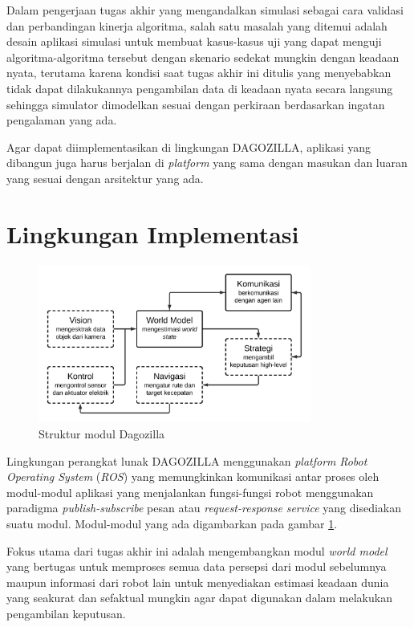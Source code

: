 Dalam pengerjaan tugas akhir yang mengandalkan simulasi sebagai cara validasi dan perbandingan kinerja algoritma, salah satu masalah yang ditemui adalah desain aplikasi simulasi untuk membuat kasus-kasus uji yang dapat menguji algoritma-algoritma tersebut dengan skenario sedekat mungkin dengan keadaan nyata, terutama karena kondisi saat tugas akhir ini ditulis yang menyebabkan tidak dapat dilakukannya pengambilan data di keadaan nyata secara langsung sehingga simulator dimodelkan sesuai dengan perkiraan berdasarkan ingatan pengalaman yang ada.

Agar dapat diimplementasikan di lingkungan DAGOZILLA, aplikasi yang dibangun juga harus berjalan di \textit{platform} yang sama dengan masukan dan luaran yang sesuai dengan arsitektur yang ada.

\section{Lingkungan Implementasi}

\begin{figure}[h]
    \centering
    \includegraphics[width=0.8\textwidth]{resources/dagozilla-structure.png}
    \caption{Struktur modul Dagozilla}
    \label{fig:dagozilla-structure}
\end{figure}

Lingkungan perangkat lunak DAGOZILLA menggunakan \textit{platform} \textit{Robot Operating System} (\textit{ROS}) yang memungkinkan komunikasi antar proses oleh modul-modul aplikasi yang menjalankan fungsi-fungsi robot menggunakan paradigma \textit{publish-subscribe} pesan atau \textit{request-response} \textit{service} yang disediakan suatu modul. Modul-modul yang ada digambarkan pada gambar \ref{fig:dagozilla-structure}.

Fokus utama dari tugas akhir ini adalah mengembangkan modul \textit{world model} yang bertugas untuk memproses semua data persepsi dari modul sebelumnya maupun informasi dari robot lain untuk menyediakan estimasi keadaan dunia yang seakurat dan sefaktual mungkin agar dapat digunakan dalam melakukan pengambilan keputusan.

